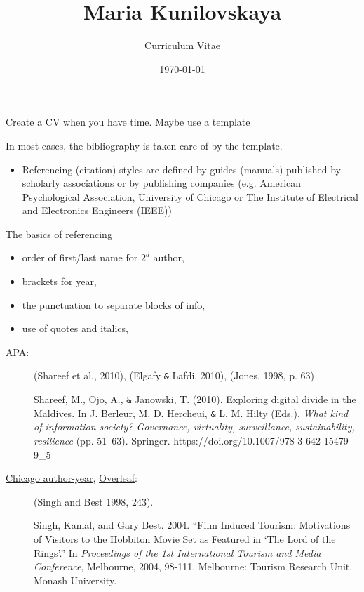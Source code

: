 \documentclass[a4paper,11pt]{article}
\title{Maria Kunilovskaya}
\author{Curriculum Vitae}
\date{\today}
\begin{document}
	
\clearpage
\maketitle
\thispagestyle{empty}


\begin{tcolorbox}[colback=red!5!white, colframe=red!75!black]
	\centering
	{\Large{Create a CV when you have time. Maybe use a template}}
\end{tcolorbox}
\bigskip
In most cases, the bibliography is taken care of by the template. \\

\begin{itemize}
	\item Referencing (citation) styles are defined by guides (manuals) published by scholarly associations or by publishing companies (e.g. American Psychological Association, University of Chicago or The Institute of Electrical and Electronics Engineers (IEEE))
\end{itemize}

\href{https://www.citethemrightonline.com/Basics}{\underline{The basics of referencing}}


\begin{multicols}{2}
	\begin{itemize}
		\item order of first/last name for $2^d$ author,
		\item brackets for year,
		\item the punctuation to separate blocks of info,
		\item use of quotes and italics,
	\end{itemize}
\end{multicols}

       

\begin{description}
	\item[APA:]	(Shareef et al., 2010), (Elgafy \verb|&| Lafdi, 2010), (Jones, 1998, p. 63)
	
	Shareef, M., Ojo, A., \verb|&| Janowski, T. (2010). Exploring digital divide in the Maldives. In J. Berleur, M. D. Hercheui, \verb|&| L. M. Hilty (Eds.), \textit{What kind of information society? Governance, virtuality, surveillance, sustainability, resilience} (pp. 51–63). Springer. https://doi.org/10.1007/978-3-642-15479-9\_5
	
	\item[\href{https://www.chicagomanualofstyle.org/tools_citationguide/citation-guide-2.html}{Chicago author-year}, \href{https://www.overleaf.com/2121398454pztnvnjshsgk}{Overleaf}:]
	(Singh and Best 1998, 243).
	
	Singh, Kamal, and Gary Best. 2004. ``Film Induced Tourism: Motivations of Visitors to the Hobbiton Movie Set as Featured in `The Lord of the Rings'.'' In \textit{Proceedings of the 1st International Tourism and Media Conference}, Melbourne, 2004, 98-111. Melbourne: Tourism Research Unit, Monash University.
	
	
\end{description}
\end{document}
